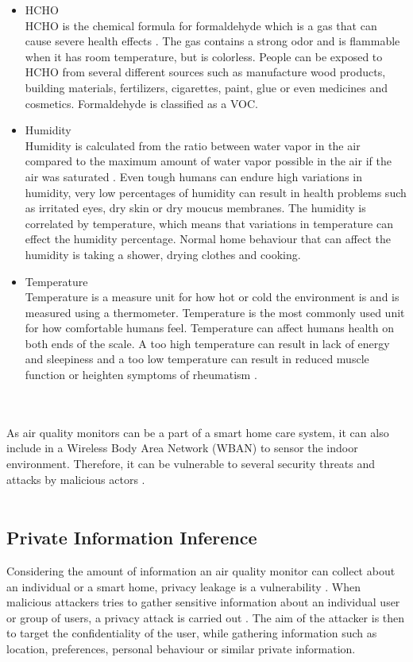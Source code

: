 \begin{itemize}
     \item HCHO\\
        HCHO is the chemical formula for formaldehyde which is a gas that can cause severe health effects \cite{HCHO}. The gas contains a strong odor and is flammable when it has room temperature, but is colorless. People can be exposed to HCHO from several different sources such as manufacture wood products, building materials, fertilizers, cigarettes, paint, glue or even medicines and cosmetics. Formaldehyde is classified as a VOC.
    \item Humidity\\
        Humidity is calculated from the ratio between water vapor in the air compared to the maximum amount of water vapor possible in the air if the air was saturated \cite{RecommendedIAQ}. Even tough humans can endure high variations in humidity, very low percentages of humidity can result in health problems such as irritated eyes, dry skin or dry moucus membranes. The humidity is correlated by temperature, which means that variations in temperature can effect the humidity percentage. Normal home behaviour that can affect the humidity is taking a shower, drying clothes and cooking. 
    \item Temperature\\
        Temperature is a measure unit for how hot or cold the environment is and is measured using a thermometer. Temperature is the most commonly used unit for how comfortable humans feel. Temperature can affect humans health on both ends of the scale. A too high temperature can result in lack of energy and sleepiness and a too low temperature can result in reduced muscle function or heighten symptoms of rheumatism \cite{Temp}.
\end{itemize}


\\\\
As air quality monitors can be a part of a smart home care system, it can also include in a Wireless Body Area Network (WBAN) to sensor the indoor environment. Therefore, it can be vulnerable to several security threats and attacks by malicious actors \cite{AttackstoAQMs}. 
\\\\

\subsection{Private Information Inference}
Considering the amount of information an air quality monitor can collect about an individual or a smart home, privacy leakage is a vulnerability \cite{SecPrivSmartCity}. When malicious attackers tries to gather sensitive information about an individual user or group of users, a privacy attack is carried out \cite{CyberEntitySecInIoT}. The aim of the attacker is then to target the confidentiality of the user, while gathering information such as location, preferences, personal behaviour or similar private information.

